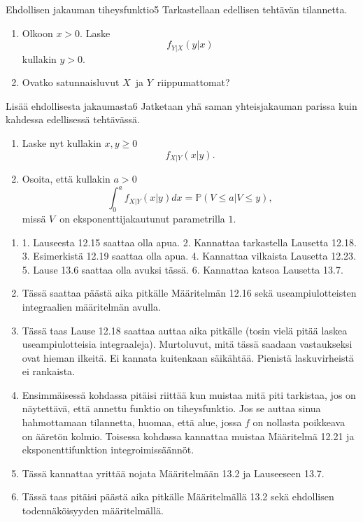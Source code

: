 \documentclass[11pt,a4paper]{amsart}
\newcommand{\1}{\mathbf{1}}
\renewcommand{\P}{\mathbb P}
\begin{document}
\begin{Exercises}{Ehdollisen jakauman tiheysfunktio}{5}
Tarkastellaan edellisen tehtävän tilannetta. 
\begin{enumerate}
\item Olkoon $x>0$. Laske 
\[
f_{Y|X}(y|x)
\]
kullakin $y>0$.


\item Ovatko satunnaisluvut $X$ ja $Y$ riippumattomat?


\end{enumerate}
\end{Exercises}

\begin{Exercises}{Lisää ehdollisesta jakaumasta}{6}
Jatketaan yhä saman yhteisjakauman parissa kuin kahdessa edellisessä tehtävässä.
\begin{enumerate}
\item Laske nyt kullakin $x,y\geq 0$
\[
f_{X|Y}(x|y).
\]


\item Osoita, että kullakin $a>0$
\[
\int_0^a f_{X|Y}(x|y)dx=\P(V\leq a|V\leq y),
\] 
missä $V$ on eksponenttijakautunut parametrilla $1$.


\end{enumerate}
\end{Exercises}
\begin{Solution}
\begin{enumerate}
\item 1.  Lauseesta 12.15 saattaa olla apua. 2. Kannattaa tarkastella Lausetta 12.18. 3. Esimerkistä 12.19 saattaa olla apua. 4. Kannattaa vilkaista Lausetta 12.23. 5. Lause 13.6 saattaa olla avuksi tässä. 6. Kannattaa katsoa Lausetta 13.7.
\item Tässä saattaa päästä aika pitkälle Määritelmän 12.16 sekä useampiulotteisten integraalien määritelmän avulla. 
\item Tässä taas Lause 12.18 saattaa auttaa aika pitkälle (tosin vielä pitää laskea useampiulotteisia integraaleja). Murtoluvut, mitä tässä saadaan vastaukseksi ovat hieman ilkeitä. Ei kannata kuitenkaan säikähtää. Pienistä laskuvirheistä ei rankaista. 
\item Ensimmäisessä kohdassa pitäisi riittää kun muistaa mitä piti tarkistaa, jos on näytettävä, että annettu funktio on tiheysfunktio. Jos se auttaa sinua hahmottamaan tilannetta, huomaa, että alue, jossa $f$ on nollasta poikkeava on ääretön kolmio. Toisessa kohdassa kannattaa muistaa Määritelmä 12.21 ja eksponenttifunktion integroimissäännöt.
\item Tässä kannattaa yrittää nojata Määritelmään 13.2 ja Lauseeseen 13.7.
\item Tässä taas pitäisi päästä aika pitkälle Määritelmällä 13.2 sekä ehdollisen todennäköisyyden määritelmällä. 
\end{enumerate}
\end{Solution}
\end{document}
